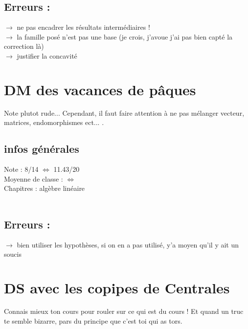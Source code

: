 \documentclass{book}
\begin{document}
\subsection{Erreurs :}

$\rightarrow$ ne pas encadrer les résultats intermédiaires ! \\
$\rightarrow$ la famille posé n'est pas une base (je crois, j'avoue j'ai pas bien capté la correction là) \\
$\rightarrow$ justifier la concavité





\section{DM des vacances de pâques}

\begin{tcolorbox}[width={14cm},colback={yellow!20!white},title={\textbf{Commentaire générale sur ce DS}},colbacktitle=red!40!white,coltitle=black]
	Note plutot rude... Cependant, il faut faire attention à ne pas mélanger vecteur, matrices, endomorphismes ect... .
\end{tcolorbox}

\subsection{infos générales}

Note : 8/14 $\Leftrightarrow$ 11.43/20\\
Moyenne de classe : $\Leftrightarrow$ \\
Chapitres : algèbre linéaire \\ \\

\subsection{Erreurs :}

$\rightarrow$ bien utiliser les hypothèses, si on en a pas utilisé, y'a moyen qu'il y ait un soucis \\


\section{DS avec les copipes de Centrales}
\begin{tcolorbox}[width={14cm},colback={yellow!20!white},title={\textbf{Commentaire générale sur ce DS}},colbacktitle=red!40!white,coltitle=black]
	Connais mieux ton cours pour rouler sur ce qui est du cours ! Et quand un truc te semble bizarre, pars du principe que c'est toi qui as tors.
\end{tcolorbox}
\end{document}
